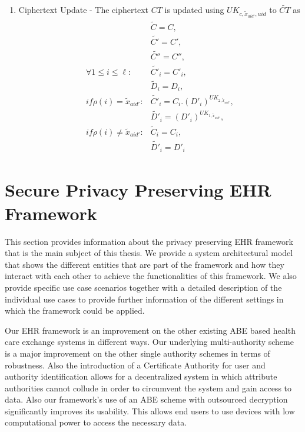 \begin{enumerate}
\begin{enumerate}
		\item Ciphertext Update - The ciphertext $CT$ is updated using ${UK}_{c,\tilde{x}_{aid'},uid}$ to $\tilde{CT}$ as
		\begin{align}
		\begin{split}
		&\tilde{C} = C, \\ &\tilde{C'} = C', \\ &\tilde{C''} = C'',\\
		\forall 1 \leq i \leq \ell : &\tilde{C'}_{i} = C'_{i}, \\ &\tilde{D}_{i} = D_{i},\\
		if \rho(i) = \tilde{x}_{aid'} : &\tilde{C'}_{i} = C_{i} . (D'_{i})^{UK_{2,\tilde{x}_{aid'}}}, \\ &\tilde{D'}_{i} = (D'_{i})^{UK_{1,\tilde{x}_{aid'}}},\\
		if \rho(i) \neq \tilde{x}_{aid'} : &\tilde{C}_{i} = C_{i}, \\ &\tilde{D'}_{i} = D'_{i}
		\end{split}
		\end{align}
	\end{enumerate}
	
\end{enumerate}


\section{Secure Privacy Preserving EHR Framework}

This section provides information about the privacy preserving EHR framework that is the main subject of this thesis. We provide a system architectural model that shows the different entities that are part of the framework and how they interact with each other to achieve the functionalities of this framework. We also provide specific use case scenarios together with a detailed description of the individual use cases to provide further information of the different settings in which the framework could be applied.

Our EHR framework is an improvement on the other existing ABE based health care exchange systems in different ways. Our underlying multi-authority scheme is a major improvement on the other single authority schemes in terms of robustness. Also the introduction of a Certificate Authority for user and authority identification allows for a decentralized system in which attribute authorities cannot collude in order to circumvent the system and gain access to data. Also our framework's use of an ABE scheme with outsourced decryption significantly improves its usability. This allows end users to use devices with low computational power to access the necessary data.

